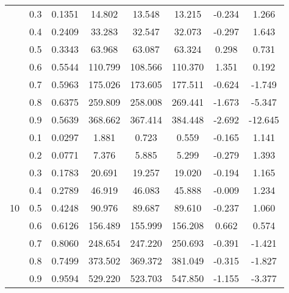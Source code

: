\documentclass[11pt,a4paper]{report}
\begin{document}
\begin{longtable}{ | c | c || c | c | c | c | c | c | }
 & 0.3 & 0.1351 & 14.802 & 13.548 & 13.215 & -0.234 & 1.266 \\
 & 0.4 & 0.2409 & 33.283 & 32.547 & 32.073 & -0.297 & 1.643 \\
 & 0.5 & 0.3343 & 63.968 & 63.087 & 63.324 & 0.298 & 0.731 \\
 & 0.6 & 0.5544 & 110.799 & 108.566 & 110.370 & 1.351 & 0.192 \\
 & 0.7 & 0.5963 & 175.026 & 173.605 & 177.511 & -0.624 & -1.749 \\
 & 0.8 & 0.6375 & 259.809 & 258.008 & 269.441 & -1.673 & -5.347 \\
 & 0.9 & 0.5639 & 368.662 & 367.414 & 384.448 & -2.692 & -12.645 \\
 \hline
\multirow{9}{*}{10} & 0.1 & 0.0297 & 1.881 & 0.723 & 0.559 & -0.165 & 1.141 \\
 & 0.2 & 0.0771 & 7.376 & 5.885 & 5.299 & -0.279 & 1.393 \\
 & 0.3 & 0.1783 & 20.691 & 19.257 & 19.020 & -0.194 & 1.165 \\
 & 0.4 & 0.2789 & 46.919 & 46.083 & 45.888 & -0.009 & 1.234 \\
 & 0.5 & 0.4248 & 90.976 & 89.687 & 89.610 & -0.237 & 1.060 \\
 & 0.6 & 0.6126 & 156.489 & 155.999 & 156.208 & 0.662 & 0.574 \\
 & 0.7 & 0.8060 & 248.654 & 247.220 & 250.693 & -0.391 & -1.421 \\
 & 0.8 & 0.7499 & 373.502 & 369.372 & 381.049 & -0.315 & -1.827 \\
 & 0.9 & 0.9594 & 529.220 & 523.703 & 547.850 & -1.155 & -3.377 \\
 \hline
\hline
\end{longtable}
\end{document}
